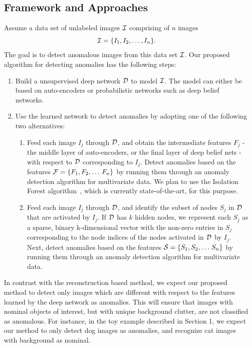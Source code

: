 \documentclass[10pt,twocolumn,letterpaper]{article}
\begin{document}
\subsection{Framework and Approaches}
Assume a data set of unlabeled images ${\cal{I}}$ comprising of $n$ images $${\cal{I}} = \{I_1, I_2, \dots, I_n\}.$$ The goal is to detect anomalous images from this data set ${\cal{I}}$. Our proposed algorithm for detecting anomalies has the following steps:
\begin{enumerate}
\item Build a unsupervised deep network ${\cal{D}}$ to model ${\cal{I}}$. The model can either be based on auto-encoders or probabilistic networks such as deep belief networks.
\item Use the learned network to detect anomalies by adopting one of the following two alternatives:
\begin{enumerate}
\item Feed each image $I_j$ through ${\cal{D}}$, and obtain the intermediate features $F_j$ - the middle layer of auto-encoders, or the final layer of deep belief nets - with respect to ${\cal{D}}$ corresponding to $I_j$. Detect anomalies based on the features ${\cal{F}} = \{F_1, F_2, \dots\, F_n\}$ by running them through an anomaly detection algorithm for multivariate data. We plan to use the Isolation Forest algorithm~\cite{iforest}, which is currently state-of-the-art, for this purpose.
\item Feed each image $I_j$ through ${\cal{D}}$, and identify the subset of nodes $S_j$ in ${\cal{D}}$ that are activated by $I_j$. If ${\cal{D}}$ has $k$ hidden nodes,  we represent each $S_j$  as a sparse, binary k-dimensional vector with the non-zero entries in $S_j$ corresponding to the node indices of the nodes activated in ${\cal{D}}$ by $I_j$. Next, detect anomalies based on the features ${\cal{S}} = \{S_1, S_2, \dots\, S_n\}$ by running them through an anomaly detection algorithm for multivariate data.
\end{enumerate}
\end{enumerate}

In contrast with the reconstruction based method, we expect our proposed method to detect only images which are different with respect to the features learned by the deep network as anomalies. This will ensure that images with nominal objects of interest, but with unique background clutter, are not classified as anomalous. For instance, in the toy example described in Section 1, we expect our method to only detect dog images as anomalies, and recognize cat images with background as nominal.
\end{document}
